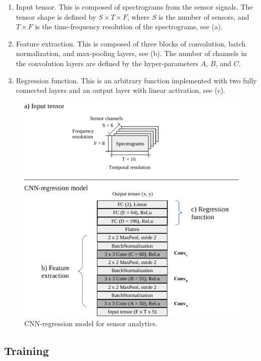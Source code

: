 \begin{enumerate}[label=\alph*)]
\item Input tensor. This is composed of spectrograms from the sensor signals. The tensor shape is defined by $S \times T \times F$, where $S$ is the number of sensors, and $T \times F$ is the time-frequency resolution of the spectrograms, see (a).

\item Feature extraction. This is composed of three blocks of convolution, batch normalization, and max-pooling layers, see (b). The number of channels in the convolution layers are defined by the hyper-parameters $A$, $B$, and $C$.

\item Regression function. This is an arbitrary function implemented with two fully connected layers and an output layer with linear activation, see (c).
\end{enumerate}


\begin{figure}[t!]
	\centering
	\includegraphics[width=\columnwidth]{../figures/models.pdf}
	\caption{CNN-regression model for sensor analytics.}
	\label{fig:model}
\end{figure}


\subsection{Training}
